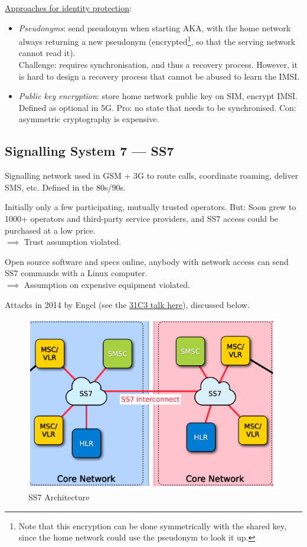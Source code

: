 \underline{Approaches for identity protection}:
\begin{itemize}
	\item \textit{Pseudonyms}: send pseudonym when starting AKA, with the home network always returning a new pseudonym
	      (encrypted\footnote{Note that this encryption can be done symmetrically with the shared key, since the home network could use the pseudonym to look it up.}, so that the serving network cannot read it).\\
	      Challenge: requires synchronisation, and thus a recovery process.
	      However, it is hard to design a recovery process that cannot be abused to learn the IMSI.
	\item \textit{Public key encryption}: store home network public key on SIM, encrypt IMSI.
	      Defined as optional in 5G.
	      Pro: no state that needs to be synchronised.
	      Con: asymmetric cryptography is expensive.
\end{itemize}

\subsection{Signalling System 7 --- SS7}

Signalling network used in GSM + 3G to route calls, coordinate roaming, deliver
SMS, etc. Defined in the 80s/90s.

Initially only a few participating, mutually trusted operators. But: Soon grew
to 1000+ operators and third-party service providers, and SS7 access could be
purchased at a low price.\\ $\implies$ Trust assumption violated.

Open source software and specs online, anybody with network access can send SS7
commands with a Linux computer.\\ $\implies$ Assumption on expensive equipment
violated.

Attacks in 2014 by Engel (see the
\href{https://media.ccc.de/v/31c3\_-\_6249\_-\_en\_-\_saal\_1\_-\_201412271715\_-\_ss7\_locate\_track\_manipulate\_-\_tobias\_engel}{31C3
	talk here}), discussed below.

\begin{figure}[h]
	\centering
	\includegraphics[scale=0.5]{images/10-ss7.png}
	\caption{SS7 Architecture}
	\label{fig:ss7}
\end{figure}

